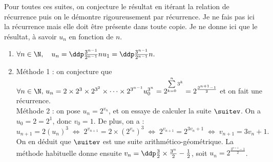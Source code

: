 
\begin{correction} \;
Pour toutes ces suites, on conjecture le r\'esultat en it\'erant la relation de r\'ecurrence puis on le d\'emontre rigoureusement par r\'ecurrence. Je ne fais pas ici la r\'ecurrence mais elle doit \^etre pr\'esente dans toute copie. Je ne donne ici que le r\'esultat, \`a savoir $u_n$ en fonction de $n$.
\begin{enumerate}
\item $\forall n\in\N,\quad u_n=\ddp\frac{3^{n-1}}{2^{n-1}}nu_1=\ddp\frac{3^{n-1} }{2^{n-1}}n.$
\item M\'ethode 1 : on conjecture que $\forall n\in\N,\,u_n=2\times 2^3\times 2^{3^2}\times\dots\times 2^{3^{n-1}} u_0^{3^n}=2^{\sum\limits_{k=0}^{n} 3^k } = 2^{\frac{3^{n+1}-1}{2}}$ et on fait une r\'ecurrence.\\
M\'ethode 2 : on pose $u_n = 2^{v_n}$, et on essaye de calculer la suite $\suitev$. On a $u_0=2=2^1$, donc $v_0=1$. De plus, on a :
$$u_{n+1} =2(u_n)^3 \; \Leftrightarrow \;  2^{v_{n+1}} =  2\times (2^{v_n})^3 \; \Leftrightarrow \; 2^{v_{n+1}} =  2^{3v_n+1} \; \Leftrightarrow \; v_{n+1} = 3v_{n}+1.$$
On en d\'eduit que $\suitev$ est une suite arithm\'etico-g\'eom\'etrique. La m\'ethode habituelle donne ensuite $v_n=\ddp\frac{3}{2}\times\frac{3^{n}}{2}-\frac{1}{2}$, soit $u_n= 2^{\frac{3^{n+1}-1}{2}}$.
\end{enumerate}
\end{correction}